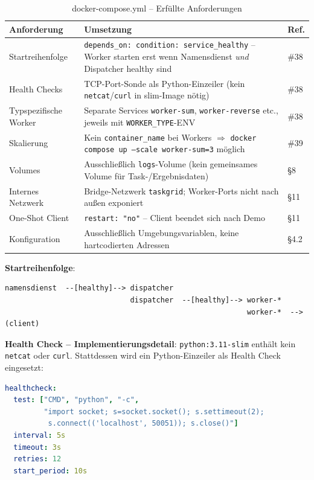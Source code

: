 \begin{table}[H]
\centering
\begin{tabular}{p{4.5cm}p{10cm}l}
\toprule
\textbf{Anforderung} & \textbf{Umsetzung} & \textbf{Ref.} \\
\midrule
Startreihenfolge &
  \texttt{depends\_on: condition: service\_healthy} -- Worker starten erst
  wenn Namensdienst \emph{und} Dispatcher healthy sind &
  \#38 \\
Health Checks &
  TCP-Port-Sonde als Python-Einzeiler (kein \texttt{netcat}/\texttt{curl}
  in slim-Image nötig) &
  \#38 \\
Typspezifische Worker &
  Separate Services \texttt{worker-sum}, \texttt{worker-reverse} etc.,
  jeweils mit \texttt{WORKER\_TYPE}-ENV &
  \#38 \\
Skalierung &
  Kein \texttt{container\_name} bei Workers $\Rightarrow$
  \texttt{docker compose up --scale worker-sum=3} möglich &
  \#39 \\
Volumes &
  Ausschließlich \texttt{logs}-Volume (kein gemeinsames Volume
  für Task-/Ergebnisdaten) &
  §8 \\
Internes Netzwerk &
  Bridge-Netzwerk \texttt{taskgrid}; Worker-Ports nicht nach außen
  exponiert &
  §11 \\
One-Shot Client &
  \texttt{restart: "no"} -- Client beendet sich nach Demo &
  §11 \\
Konfiguration &
  Ausschließlich Umgebungsvariablen, keine hartcodierten Adressen &
  §4.2 \\
\bottomrule
\end{tabular}
\caption{docker-compose.yml -- Erfüllte Anforderungen}
\end{table}

\textbf{Startreihenfolge}:

\begin{lstlisting}[language={},caption={Startabhängigkeiten in docker-compose.yml}]
namensdienst  --[healthy]--> dispatcher
                             dispatcher  --[healthy]--> worker-*
                                                        worker-*  -->  (client)
\end{lstlisting}

\textbf{Health Check -- Implementierungsdetail}:
\texttt{python:3.11-slim} enthält kein \texttt{netcat} oder \texttt{curl}.
Stattdessen wird ein Python-Einzeiler als Health Check eingesetzt:

\begin{lstlisting}[language=yaml,caption={Health Check (Dispatcher, Port 50051)}]
healthcheck:
  test: ["CMD", "python", "-c",
         "import socket; s=socket.socket(); s.settimeout(2);
          s.connect(('localhost', 50051)); s.close()"]
  interval: 5s
  timeout: 3s
  retries: 12
  start_period: 10s
\end{lstlisting}

